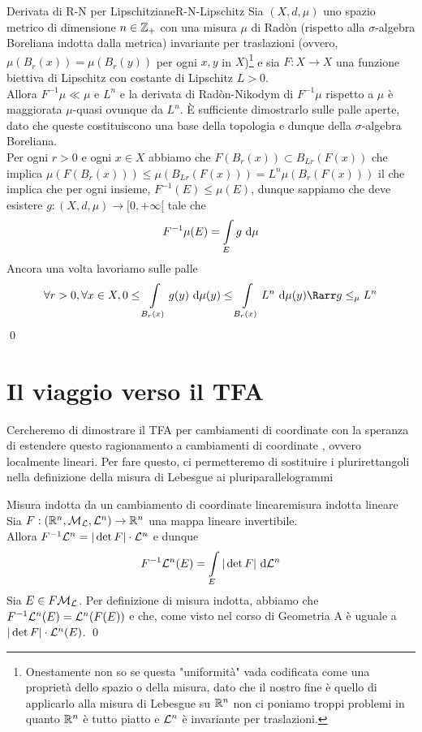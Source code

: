 \documentclass[openany]{book}
\begin{document}
\begin{proposition}{Derivata di R-N per Lipschitziane}{R-N-Lipschitz}
    Sia $(X,d,\mu)$ uno spazio metrico di dimensione $n \in \mathbb{Z}_+$ con una misura $\mu$ di Radòn (rispetto alla $\sigma$-algebra Boreliana indotta dalla metrica) invariante per traslazioni (ovvero, $\mu(B_r(x)) = \mu(B_r(y))$ per ogni $x,y$ in $X$)\footnote{Onestamente non so se questa "uniformità" vada codificata come una proprietà dello spazio o della misura, dato che il nostro fine è quello di applicarlo alla misura di Lebesgue su $\mathbb{R}^n$ non ci poniamo troppi problemi in quanto $\mathbb{R}^n$ è tutto piatto e $\mathcal{L}^n$ è invariante per traslazioni.} e sia $F:X \to X$ una funzione biettiva di Lipschitz con costante di Lipschitz $L>0$.\\
    Allora $F^{-1}\mu \ll \mu$ e $L^n$ e la derivata di Radòn-Nikodym di $F^{-1}\mu$ rispetto a $\mu$ è maggiorata $\mu$-quasi ovunque da $L^n$.
    \proof
    È sufficiente dimostrarlo sulle palle aperte, dato che queste costituiscono una base della topologia e dunque della $\sigma$-algebra Boreliana.\\
    Per ogni $r>0$ e ogni $x \in X$ abbiamo che  $F(B_r(x)) \subset B_{Lr}(F(x))$ che implica $\mu(F(B_r(x)))\le \mu(B_{Lr}(F(x))) = L^n\mu(B_r(F(x)))$ il che implica che per ogni insieme, $F^{-1}(E) \le \mu(E)$, dunque sappiamo che deve esistere $g: (X,d,\mu)\to [0,+\infty[$ tale che
    \[F^{-1}\mu(E) = \intop_E g \de \mu\]
    Ancora una volta lavoriamo sulle palle
    \[\forall r>0,\forall x \in X, 0\le \intop_{B_r(x)} g(y)\de \mu(y) \le \intop_{B_r(x)} L^n \de\mu(y) \Rarr g \le_\mu L^n \]
    \qed
\end{proposition}

\section{Il viaggio verso il TFA}

Cercheremo di dimostrare il TFA per cambiamenti di coordinate  con la speranza di estendere questo ragionamento a cambiamenti di coordinate , ovvero localmente lineari. Per fare questo, ci permetteremo di sostituire i plurirettangoli nella definizione della misura di Lebesgue ai pluriparallelogrammi

\begin{lemma}{Misura indotta da un cambiamento di coordinate lineare}{misura indotta lineare}
    Sia $F: (\mathbb{R}^n, \mathcal{M}_{\mathcal{L}}, \mathcal{L}^n) \to \mathbb{R}^n$ una mappa lineare invertibile.\\
    Allora $F^{-1}\mathcal{L}^n = |\det F|\cdot \mathcal{L}^n$ e dunque
    \[F^{-1}\L^n(E) = \intop_E |\det F|\de \L^n\]
    \proof
    Sia $E \in F\mathcal{M}_{\mathcal{L}}$. Per definizione di misura indotta, abbiamo che $F^{-1}\mathcal{L}^n(E) = \mathcal{L}^n(F(E))$ e che, come visto nel corso di Geometria A è uguale a $|\det F|\cdot \mathcal{L}^n(E)$.
    \qed
\end{lemma}
\end{document}
